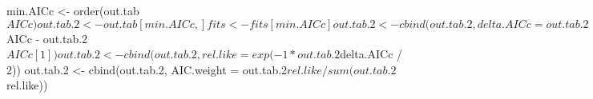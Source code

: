 \begin{Schunk}
\begin{Sinput}
 min.AICc <- order(out.tab$AICc)
 out.tab.2 <- out.tab[min.AICc, ]
 fits <- fits[min.AICc]
 out.tab.2 <- cbind(out.tab.2, delta.AICc = out.tab.2$AICc - out.tab.2$AICc[1])
 out.tab.2 <- cbind(out.tab.2, rel.like = exp(-1 * out.tab.2$delta.AICc / 2))
 out.tab.2 <- cbind(out.tab.2, AIC.weight = out.tab.2$rel.like / sum(out.tab.2$rel.like))
\end{Sinput}
\end{Schunk}
